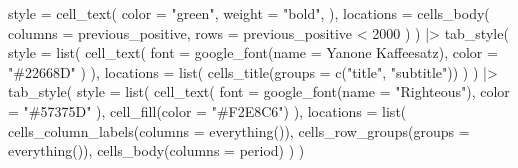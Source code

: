 \documentclass[
]{article}
\newenvironment{Shaded}{\begin{snugshade}}{\end{snugshade}}
\newcommand{\AttributeTok}[1]{\textcolor[rgb]{0.77,0.63,0.00}{#1}}
\newcommand{\DecValTok}[1]{\textcolor[rgb]{0.00,0.00,0.81}{#1}}
\newcommand{\FunctionTok}[1]{\textcolor[rgb]{0.00,0.00,0.00}{#1}}
\newcommand{\NormalTok}[1]{#1}
\newcommand{\SpecialCharTok}[1]{\textcolor[rgb]{0.00,0.00,0.00}{#1}}
\newcommand{\StringTok}[1]{\textcolor[rgb]{0.31,0.60,0.02}{#1}}
\begin{document}
\begin{Shaded}
\begin{Highlighting}[]
    \AttributeTok{style =} \FunctionTok{cell\_text}\NormalTok{(}
      \AttributeTok{color =} \StringTok{"green"}\NormalTok{,}
      \AttributeTok{weight =} \StringTok{"bold"}\NormalTok{,}
\NormalTok{    ),}
    \AttributeTok{locations =} \FunctionTok{cells\_body}\NormalTok{(}
      \AttributeTok{columns =}\NormalTok{ previous\_positive,}
      \AttributeTok{rows =}\NormalTok{ previous\_positive }\SpecialCharTok{\textless{}} \DecValTok{2000}
\NormalTok{    )}
\NormalTok{  ) }\SpecialCharTok{|\textgreater{}} 
  \FunctionTok{tab\_style}\NormalTok{(}
      \AttributeTok{style =} \FunctionTok{list}\NormalTok{(}
        \FunctionTok{cell\_text}\NormalTok{(}
          \AttributeTok{font =} \FunctionTok{google\_font}\NormalTok{(}\AttributeTok{name =} \StringTok{\textquotesingle{}Yanone Kaffeesatz\textquotesingle{}}\NormalTok{), }
          \AttributeTok{color =} \StringTok{"\#22668D"}
\NormalTok{        )}
\NormalTok{      ),}
      \AttributeTok{locations =} \FunctionTok{list}\NormalTok{(}
        \FunctionTok{cells\_title}\NormalTok{(}\AttributeTok{groups =} \FunctionTok{c}\NormalTok{(}\StringTok{"title"}\NormalTok{, }\StringTok{"subtitle"}\NormalTok{))}
\NormalTok{      )}
\NormalTok{  ) }\SpecialCharTok{|\textgreater{}} 
  \FunctionTok{tab\_style}\NormalTok{(}
    \AttributeTok{style =} \FunctionTok{list}\NormalTok{(}
      \FunctionTok{cell\_text}\NormalTok{(}
        \AttributeTok{font =} \FunctionTok{google\_font}\NormalTok{(}\AttributeTok{name =} \StringTok{"Righteous"}\NormalTok{),}
        \AttributeTok{color =} \StringTok{"\#57375D"}
\NormalTok{      ),}
      \FunctionTok{cell\_fill}\NormalTok{(}\AttributeTok{color =} \StringTok{"\#F2E8C6"}\NormalTok{)}
\NormalTok{    ),}
    \AttributeTok{locations =} \FunctionTok{list}\NormalTok{(}
      \FunctionTok{cells\_column\_labels}\NormalTok{(}\AttributeTok{columns =} \FunctionTok{everything}\NormalTok{()),}
      \FunctionTok{cells\_row\_groups}\NormalTok{(}\AttributeTok{groups =} \FunctionTok{everything}\NormalTok{()),}
      \FunctionTok{cells\_body}\NormalTok{(}\AttributeTok{columns =}\NormalTok{ period)}
\NormalTok{    )}
\NormalTok{  )}
\end{Highlighting}
\end{Shaded}
\end{document}
